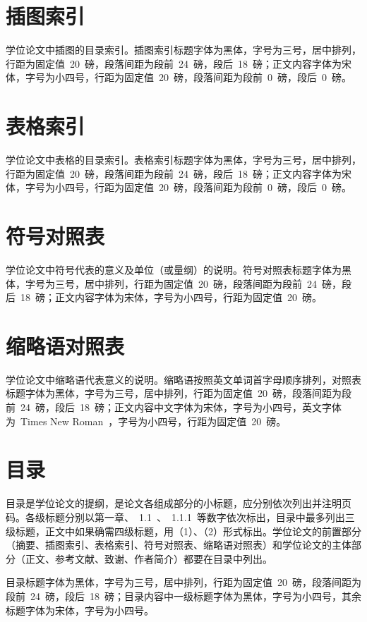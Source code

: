\section{插图索引}

学位论文中插图的目录索引。插图索引标题字体为黑体，字号为三号，居中排列，行距为固定值~20~磅，段落间距为段前~24~磅，段后~18~磅；正文内容字体为宋体，字号为小四号，行距为固定值~20~磅，段落间距为段前~0~磅，段后~0~磅。

\section{表格索引}

学位论文中表格的目录索引。表格索引标题字体为黑体，字号为三号，居中排列，行距为固定值~20~磅，段落间距为段前~24~磅，段后~18~磅；正文内容字体为宋体，字号为小四号，行距为固定值~20~磅，段落间距为段前~0~磅，段后~0~磅。

\section{符号对照表}

学位论文中符号代表的意义及单位（或量纲）的说明。符号对照表标题字体为黑体，字号为三号，居中排列，行距为固定值~20~磅，段落间距为段前~24~磅，段后~18~磅；正文内容字体为宋体，字号为小四号，行距为固定值~20~磅。

\section{缩略语对照表}

学位论文中缩略语代表意义的说明。缩略语按照英文单词首字母顺序排列，对照表标题字体为黑体，字号为三号，居中排列，行距为固定值~20~磅，段落间距为段前~24~磅，段后~18~磅；正文内容中文字体为宋体，字号为小四号，英文字体为~Times New Roman~，字号为小四号，行距为固定值~20~磅。

\section{目录}

目录是学位论文的提纲，是论文各组成部分的小标题，应分别依次列出并注明页码。各级标题分别以第一章、~1.1~、~1.1.1~等数字依次标出，目录中最多列出三级标题，正文中如果确需四级标题，用（1）、（2）形式标出。学位论文的前置部分（摘要、插图索引、表格索引、符号对照表、缩略语对照表）和学位论文的主体部分（正文、参考文献、致谢、作者简介）都要在目录中列出。

目录标题字体为黑体，字号为三号，居中排列，行距为固定值~20~磅，段落间距为段前~24~磅，段后~18~磅；目录内容中一级标题字体为黑体，字号为小四号，其余标题字体为宋体，字号为小四号。

